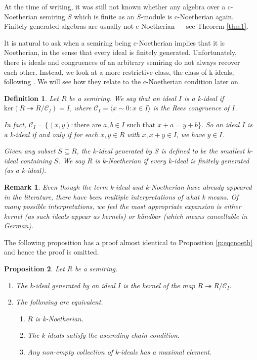 \documentclass[notitlepage, 10pt]{article}
\theoremstyle{defin}
\newtheorem{defn}{Definition}
\theoremstyle{theo}
\newtheorem{prop}[defn]{Proposition}
\theoremstyle{rema}
\newtheorem{rem}{Remark}[section]
\newcommand{\cC}{\mathcal{C}}
\begin{document}
At the time of writing, it was still not known whether any algebra over a c-Noetherian semiring $S$ which is finite as an $S$-module is c-Noetherian again. Finitely generated algebras are usually not c-Noetherian --- see Theorem \ref{thm1}.

It is natural to ask when a semiring being c-Noetherian implies that it is Noetherian, in the sense that every ideal is finitely generated. Unfortunately, there is ideals and congruences of an arbitrary semiring do not always recover each other. Instead, we look at a more restrictive class, the class of k-ideals, following \cite{abuhlail2019knoetheriankartiniansemirings}. We will see how they relate to the c-Noetherian condition later on.

\begin{defn}
    \label{d:k-Noetherian}
    Let $R$ be a semiring. We say that an ideal $I$ is a \textit{k-ideal} if $\mathrm{ker}(R\twoheadrightarrow R/\cC_I) = I$, where $\cC_I = \langle x\sim 0: x\in I\rangle$ is the Rees congruence of $I$. 

 In fact, $\cC_I = \{(x,y) : \text{there are }a,b\in I\text{ such that } x+a = y+b\}$. So an ideal $I$ is a k-ideal if and only if for each $x, y\in R$ with $x, x+y\in I$, we have $y\in I$.

    Given any subset $S\subseteq R$, the \textit{k-ideal generated by $S$} is defined to be the smallest k-ideal containing $S$. We say $R$ is \textit{k-Noetherian} if every k-ideal is finitely generated (as a k-ideal).
 \end{defn}



 \begin{rem}
     \label{r:nomkideal} Even though the term k-ideal and k-Noetherian have already appeared in the literature, there have been multiple interpretations of what k means. Of many possible interpretations, we feel the most appropriate expansion is either \textit{kernel} (as such ideals appear as kernels) or \textit{k\"undbar} (which means cancellable in German).
 \end{rem}

The following proposition has a proof almost identical to Proposition \ref{p:eqcnoeth} and hence the proof is omitted.

 \begin{prop}
     \label{p:k-Noeth}
     Let $R$ be a semiring.
     \begin{enumerate}
         \item The k-ideal generated by an ideal $I$ is the kernel of the map $R\twoheadrightarrow R/\cC_I$.
         \item The following are equivalent.
         \begin{enumerate}
             \item $R$ is k-Noetherian.
             \item The k-ideals satisfy the ascending chain condition.
             \item Any non-empty collection of k-ideals has a maximal element.
         \end{enumerate}
     \end{enumerate}
 \end{prop}
\end{document}
